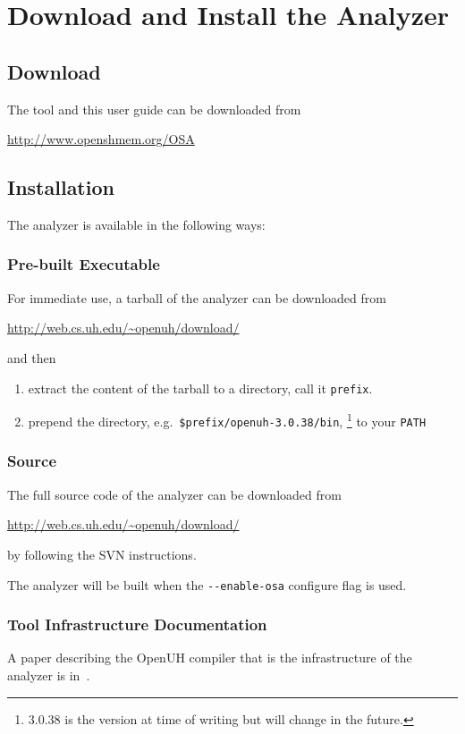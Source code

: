 \section{Download and Install the \openshmem Analyzer}

\subsection{Download}

The tool and this user guide can be downloaded from
\begin{center}
\url{http://www.openshmem.org/OSA}
\end{center}

\subsection{Installation}


The \openshmem analyzer is available in the following ways:

\subsubsection{Pre-built Executable}

For immediate use, a tarball of the \openshmem analyzer can be
downloaded from
\begin{center}
\url{http://web.cs.uh.edu/~openuh/download/}
\end{center}

and then

\begin{enumerate}
\item extract the content of the tarball to a directory, call it
  \texttt{prefix}.
\item prepend the directory,
  e.g.\ \texttt{\$prefix/openuh-3.0.38/bin},
  \footnote{3.0.38 is the version at time of writing but will change
    in the future.} to your \texttt{PATH}
\end{enumerate}


\subsubsection{Source}

The full source code of the \openshmem analyzer can be downloaded from
\begin{center}
\url{http://web.cs.uh.edu/~openuh/download/}
\end{center}
by following the SVN instructions.

The \openshmem analyzer will be built when the \texttt{-{}-{}enable-osa}
configure flag is used.

\subsubsection{Tool Infrastructure Documentation}

A paper describing the OpenUH compiler that is the infrastructure of the \openshmem analyzer is in~\cite{chapman2012experiencesspringer}.
